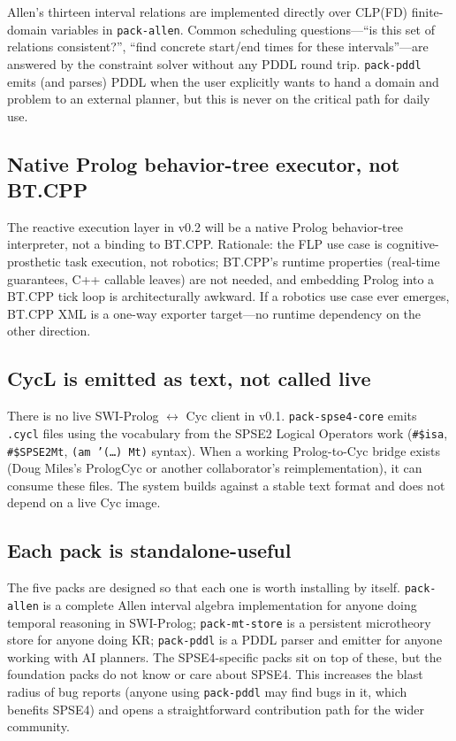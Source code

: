\documentclass[11pt,letterpaper]{article}
\begin{document}
Allen's thirteen interval relations \citep{allen-1983} are implemented directly over CLP(FD)
\citep{triska-clpfd-2012} finite-domain variables in \texttt{pack-allen}. Common scheduling
questions---``is this set of relations consistent?'', ``find concrete
start/end times for these intervals''---are answered by the constraint
solver without any PDDL round trip. \texttt{pack-pddl} emits (and parses)
PDDL when the user explicitly wants to hand a domain and problem to an
external planner, but this is never on the critical path for daily use.

\subsection{Native Prolog behavior-tree executor, not BT.CPP}

The reactive execution layer in v0.2 will be a native Prolog behavior-tree
interpreter, not a binding to BT.CPP. Rationale: the FLP use case is
cognitive-prosthetic task execution, not robotics; BT.CPP's runtime
properties (real-time guarantees, C++ callable leaves) are not needed, and
embedding Prolog into a BT.CPP tick loop is architecturally awkward. If a
robotics use case ever emerges, BT.CPP XML is a one-way exporter
target---no runtime dependency on the other direction.

\subsection{CycL is emitted as text, not called live}

There is no live SWI-Prolog $\leftrightarrow$ Cyc client in v0.1.
\texttt{pack-spse4-core} emits \texttt{.cycl} files using the vocabulary
from the SPSE2 Logical Operators work (\texttt{\#\$isa},
\texttt{\#\$SPSE2Mt}, \texttt{(am '(\ldots) Mt)} syntax). When a working
Prolog-to-Cyc bridge exists (Doug Miles's PrologCyc or another
collaborator's reimplementation), it can consume these files. The system
builds against a stable text format and does not depend on a live Cyc
image.

\subsection{Each pack is standalone-useful}

The five packs are designed so that each one is worth installing by itself.
\texttt{pack-allen} is a complete Allen interval algebra implementation
for anyone doing temporal reasoning in SWI-Prolog; \texttt{pack-mt-store}
is a persistent microtheory store for anyone doing KR; \texttt{pack-pddl}
is a PDDL parser and emitter for anyone working with AI planners. The
SPSE4-specific packs sit on top of these, but the foundation packs do not
know or care about SPSE4. This increases the blast radius of bug reports
(anyone using \texttt{pack-pddl} may find bugs in it, which benefits
SPSE4) and opens a straightforward contribution path for the wider
community.
\end{document}
